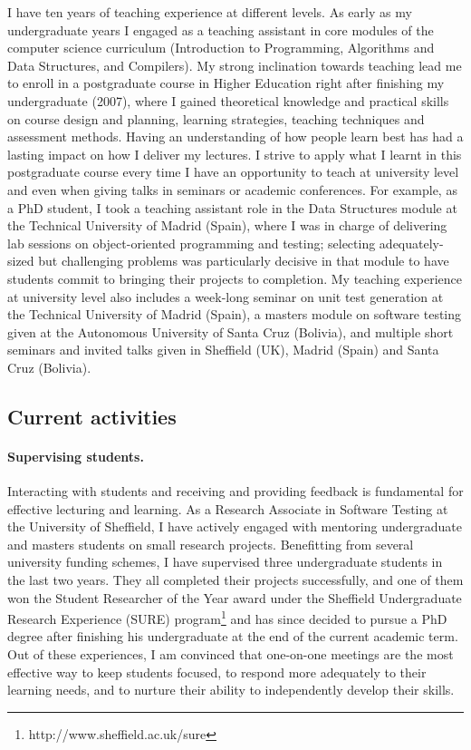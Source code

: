 \documentclass[a4paper]{article}
\begin{document}
I have ten years of teaching experience at different levels. As early
as my undergraduate years I engaged as a teaching assistant in core
modules of the computer science curriculum (Introduction to
Programming, Algorithms and Data Structures, and Compilers).
%
My strong inclination towards teaching lead me to enroll in a
postgraduate course in Higher Education right after finishing my
undergraduate (2007), where I gained theoretical knowledge and
practical skills on course design and planning, learning strategies,
teaching techniques and assessment methods.
%
Having an understanding of how people learn best has had a lasting
impact on how I deliver my lectures. I strive to apply what I learnt
in this postgraduate course every time I have an opportunity to teach
at university level and even when giving talks in seminars or academic
conferences.
%
For example, as a PhD student, I took a teaching assistant role in the
Data Structures module at the Technical University of Madrid (Spain),
where I was in charge of delivering lab sessions on object-oriented
programming and testing; selecting adequately-sized but challenging
problems was particularly decisive in that module to have students
commit to bringing their projects to completion.
%
My teaching experience at university level also includes a week-long
seminar on unit test generation at the Technical University of Madrid
(Spain), a masters module on software testing given at the Autonomous
University of Santa Cruz (Bolivia), and multiple short seminars and
invited talks given in Sheffield (UK), Madrid (Spain) and Santa Cruz
(Bolivia).


\subsection{Current activities}

\paragraph{Supervising students.} Interacting with students and
receiving and providing feedback is fundamental for effective
lecturing and learning. As a Research Associate in Software Testing at
the University of Sheffield, I have actively engaged with mentoring
undergraduate and masters students on small research
projects. Benefitting from several university funding schemes, I have
supervised three undergraduate students in the last two years. They
all completed their projects successfully, and one of them won the
Student Researcher of the Year award under the Sheffield Undergraduate
Research Experience (SURE)
program\footnote{http://www.sheffield.ac.uk/sure} and has since
decided to pursue a PhD degree after finishing his undergraduate at
the end of the current academic term. Out of these experiences, I am
convinced that one-on-one meetings are the most effective way to keep
students focused, to respond more adequately to their learning needs,
and to nurture their ability to independently develop their skills.
\end{document}
